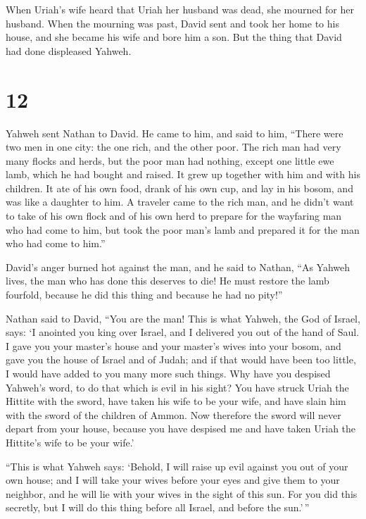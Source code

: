  When Uriah's wife heard that Uriah her husband was dead,
she mourned for her husband.  When the mourning was past,
David sent and took her home to his house, and she became his wife and
bore him a son. But the thing that David had done displeased Yahweh.

\hypertarget{section-11}{%
\section{12}\label{section-11}}

 Yahweh sent Nathan to David. He came to him, and said to
him, ``There were two men in one city: the one rich, and the other poor.
 The rich man had very many flocks and herds, 
but the poor man had nothing, except one little ewe lamb, which he had
bought and raised. It grew up together with him and with his children.
It ate of his own food, drank of his own cup, and lay in his bosom, and
was like a daughter to him.  A traveler came to the rich
man, and he didn't want to take of his own flock and of his own herd to
prepare for the wayfaring man who had come to him, but took the poor
man's lamb and prepared it for the man who had come to him.''

 David's anger burned hot against the man, and he said to
Nathan, ``As Yahweh lives, the man who has done this deserves to die!
 He must restore the lamb fourfold, because he did this
thing and because he had no pity!''

 Nathan said to David, ``You are the man! This is what
Yahweh, the God of Israel, says: `I anointed you king over Israel, and I
delivered you out of the hand of Saul.  I gave you your
master's house and your master's wives into your bosom, and gave you the
house of Israel and of Judah; and if that would have been too little, I
would have added to you many more such things.  Why have you
despised Yahweh's word, to do that which is evil in his sight? You have
struck Uriah the Hittite with the sword, have taken his wife to be your
wife, and have slain him with the sword of the children of Ammon.
 Now therefore the sword will never depart from your house,
because you have despised me and have taken Uriah the Hittite's wife to
be your wife.'

 ``This is what Yahweh says: `Behold, I will raise up evil
against you out of your own house; and I will take your wives before
your eyes and give them to your neighbor, and he will lie with your
wives in the sight of this sun.  For you did this secretly,
but I will do this thing before all Israel, and before the sun.'\,''

